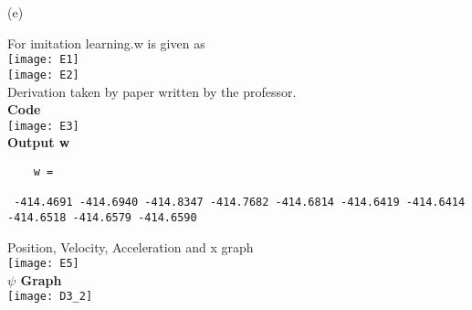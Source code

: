 \documentclass[12pt]{article}
\newenvironment{problem}[2][Problem]{\begin{trivlist}
\item[\hskip \labelsep {\bfseries #1}\hskip \labelsep {\bfseries #2.}]}{\end{trivlist}}
\begin{document}
\begin{problem} 1 (e)
\end{problem}
\begin{Answer}
For imitation learning.w is given as \\
\texttt{[image: E1]}\\
\texttt{[image: E2]}\\
Derivation taken by paper written by the professor.\\
\textbf{Code}\\
\texttt{[image: E3]}\\
\textbf{Output w}\\
\begin{verbatim}
    w =

 -414.4691 -414.6940 -414.8347 -414.7682 -414.6814 -414.6419 -414.6414 -414.6518 -414.6579 -414.6590
\end{verbatim}
 Position, Velocity, Acceleration and x graph\\
\texttt{[image: E5]}\\
\textbf{$\psi$ Graph}\\
\texttt{[image: D3\_2]}\\
\end{Answer}
\end{document}
